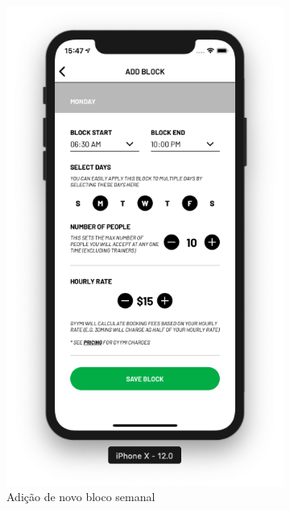 \begin{figure}[H]
\begin{subfigure}[b]{0.3\textwidth}
        \includegraphics[width=\textwidth]{pfc/figuras/gym-add-block.png}
        \caption{Adição de novo bloco semanal}
        \label{fig:gym-add-block}
    \end{subfigure}
    ~
    \begin{subfigure}[b]{0.3\textwidth}

\end{subfigure}
\end{figure}

